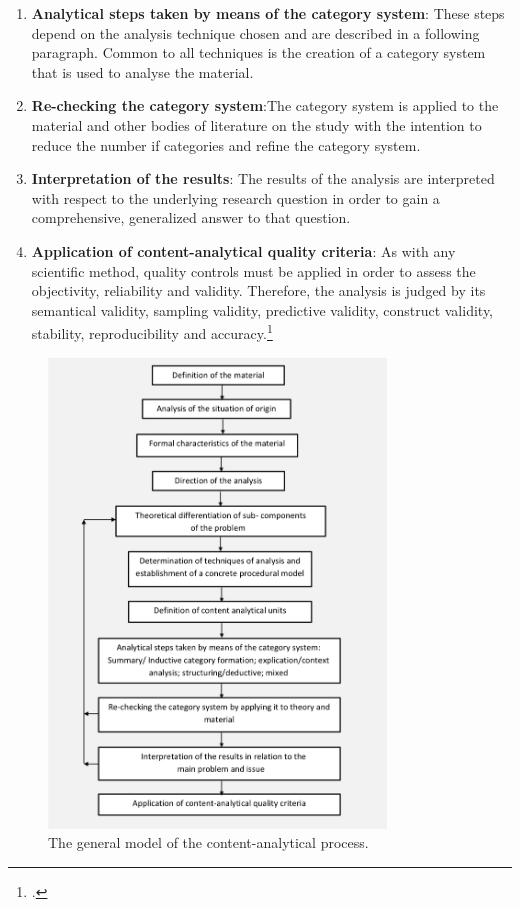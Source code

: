 \begin{enumerate}
    \item \textbf{Analytical steps taken by means of the category system}: These steps depend on the analysis technique chosen and are described in a following paragraph. Common to all techniques is the creation of a category system that is used to analyse the material.
    \item \textbf{Re-checking the category system}:The category system is applied to the material and other bodies of literature on the study with the intention to reduce the number if categories and refine the category system.
    \item \textbf{Interpretation of the results}: The results of the analysis are interpreted with respect to the underlying research question in order to gain a comprehensive, generalized answer to that question.
    \item \textbf{Application of content-analytical quality criteria}: As with any scientific method, quality controls must be applied in order to assess the objectivity, reliability and validity. Therefore, the analysis is judged by its semantical validity, sampling validity, predictive validity, construct validity, stability, reproducibility and accuracy.\footcites[Cf.][p.40 et seqq]{MayringQualitativeContentAnalysis2014}[cf.][p.280]{Flickintroductionqualitativeresearch2009}
\end{enumerate}

\begin{figure}
    \centering
    \includegraphics[width=0.8\textwidth]{graphics/MayringProcess.png}
    \caption[The general model of the content-analytical process.]{The general model of the content-analytical process.\footnotemark}
    \label{fig:MayringProcess}
\end{figure}

